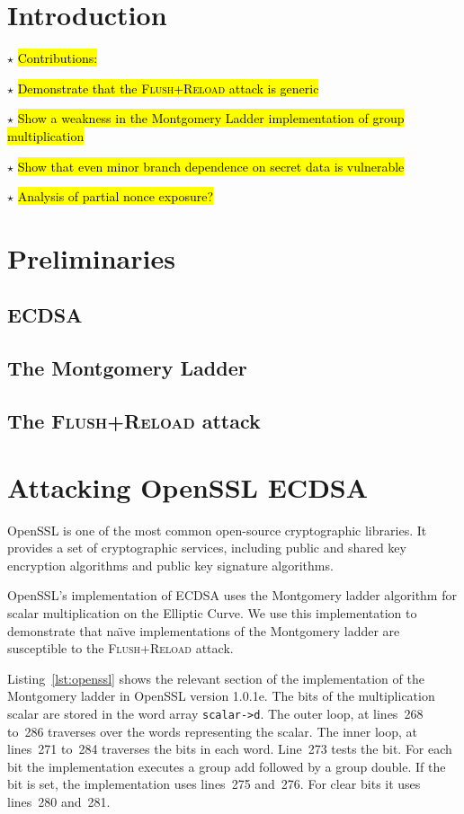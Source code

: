 \documentclass{llncs}
\newcommand{\starpar}[1]{\par{\footnotesize $\star$ \hl{#1}\par}}
\begin{document}
\begin{abstract}
\end{abstract}

\section{Introduction}

\starpar{Contributions:}
\starpar{Demonstrate that the \textsc{Flush+Reload} attack is generic}
\starpar{Show a weakness in the Montgomery Ladder implementation of group multiplication}
\starpar{Show that even minor branch dependence on secret data is vulnerable}
\starpar{Analysis of partial nonce exposure?}
\section{Preliminaries}
\subsection{ECDSA}
\subsection{The Montgomery Ladder}
\subsection{The \textsc{Flush+Reload} attack}
\section{Attacking OpenSSL ECDSA}
OpenSSL is one of the most common open-source cryptographic libraries.
It provides a set of cryptographic services, including public and shared key encryption 
algorithms and public key signature algorithms.

OpenSSL's implementation of ECDSA uses the Montgomery ladder algorithm for scalar multiplication
on the Elliptic Curve.
We use this implementation to demonstrate that na{\"\i}ve implementations of the Montgomery ladder are
susceptible to the \textsc{Flush+Reload} attack.

Listing~\ref{lst:openssl} shows the relevant section of the implementation of the Montgomery ladder in OpenSSL version 1.0.1e.
The bits of the multiplication scalar are stored in the word array \texttt{scalar->d}.
The outer loop, at lines~268 to~286 traverses over the words representing the scalar.
The inner loop, at lines~271 to~284 traverses the bits in each word.
Line~273 tests the bit. 
For each bit the implementation executes a group add followed by a group double.
If the bit is set, the implementation uses lines~275 and~276.
For clear bits it uses lines~280 and~281.
\end{document}
